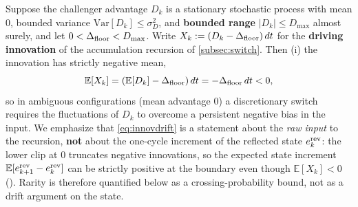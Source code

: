 \begin{proposition} \label{prop:p1}
Suppose the challenger advantage $D_k$ is a stationary stochastic process with mean 0, bounded variance $\mathrm{Var}[D_k] \le \sigma_D^2$, and \textbf{bounded range} $|D_k| \le D_{\max}$ almost surely, and let $0 < \Delta_{\text{floor}} < D_{\max}$. Write $X_k := (D_k - \Delta_{\text{floor}})\,dt$ for the \textbf{driving innovation} of the accumulation recursion of \cref{subsec:switch}. Then (i) the innovation has strictly negative mean,
\begin{equation}
\mathbb{E}[X_k] = (\mathbb{E}[D_k] - \Delta_{\text{floor}})\,dt = -\Delta_{\text{floor}}\, dt < 0,
\label{eq:innovdrift}
\end{equation}
so in ambiguous configurations (mean advantage 0) a discretionary switch requires the fluctuations of $D_k$ to overcome a persistent negative bias in the input. We emphasize that \eqref{eq:innovdrift} is a statement about the \emph{raw input} to the recursion, \textbf{not} about the one-cycle increment of the reflected state $e^{\text{rev}}_k$: the lower clip at $0$ truncates negative innovations, so the expected state increment $\mathbb{E}[e^{\text{rev}}_{k+1} - e^{\text{rev}}_k]$ can be strictly positive at the boundary even though $\mathbb{E}[X_k] < 0$ (). Rarity is therefore quantified below as a crossing-probability bound, not as a drift argument on the state.


\end{proposition}
